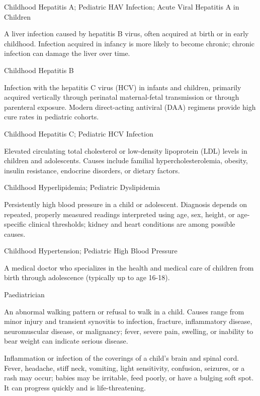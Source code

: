 \synonyms
Childhood Hepatitis A; Pediatric HAV Infection; Acute Viral Hepatitis A in Children

 A liver infection caused by hepatitis B virus, often acquired at birth or in early childhood. Infection acquired in infancy is more likely to become chronic; chronic infection can damage the liver over time.

\synonyms
Childhood Hepatitis B

 Infection with the hepatitis C virus (HCV) in infants and children, primarily acquired vertically through perinatal maternal-fetal transmission or through parenteral exposure. Modern direct-acting antiviral (DAA) regimens provide high cure rates in pediatric cohorts.

\synonyms
Childhood Hepatitis C; Pediatric HCV Infection

 Elevated circulating total cholesterol or low-density lipoprotein (LDL) levels in children and adolescents. Causes include familial hypercholesterolemia, obesity, insulin resistance, endocrine disorders, or dietary factors.

\synonyms
Childhood Hyperlipidemia; Pediatric Dyslipidemia

 Persistently high blood pressure in a child or adolescent. Diagnosis depends on repeated, properly measured readings interpreted using age, sex, height, or age-specific clinical thresholds; kidney and heart conditions are among possible causes.

\synonyms
Childhood Hypertension; Pediatric High Blood Pressure

 A medical doctor who specializes in the health and medical care of children from birth
through adolescence (typically up to age 16-18).

\synonyms
Paediatrician

 An abnormal walking pattern or refusal to walk in a child. Causes range from minor injury and transient synovitis to infection, fracture, inflammatory disease, neuromuscular disease, or malignancy; fever, severe pain, swelling, or inability to bear weight can indicate serious disease.

 Inflammation or infection of the coverings of a child’s brain and spinal cord. Fever, headache, stiff neck, vomiting, light sensitivity, confusion, seizures, or a rash may occur; babies may be irritable, feed poorly, or have a bulging soft spot. It can progress quickly and is life-threatening.

